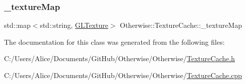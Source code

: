 \subsubsection{\texorpdfstring{\+\_\+texture\+Map}{\_textureMap}}
{\footnotesize\ttfamily std\+::map$<$std\+::string, \hyperlink{struct_otherwise_1_1_g_l_texture}{G\+L\+Texture}$>$ Otherwise\+::\+Texture\+Cache\+::\+\_\+texture\+Map\hspace{0.3cm}{\ttfamily [private]}}



The documentation for this class was generated from the following files\+:\begin{DoxyCompactItemize}
\item 
C\+:/\+Users/\+Alice/\+Documents/\+Git\+Hub/\+Otherwise/\+Otherwise/\hyperlink{_texture_cache_8h}{Texture\+Cache.\+h}\item 
C\+:/\+Users/\+Alice/\+Documents/\+Git\+Hub/\+Otherwise/\+Otherwise/\hyperlink{_texture_cache_8cpp}{Texture\+Cache.\+cpp}\end{DoxyCompactItemize}
